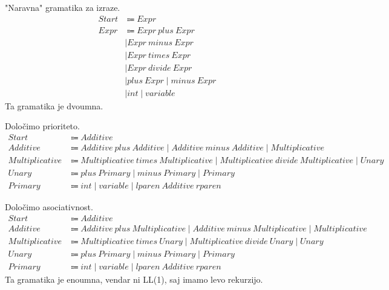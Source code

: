 \documentclass{report}
\newcommand{\Spc}{\ }
\newcommand{\Union}{\mathrel{|}}
\newcommand{\Arrow}{\Coloneq}
\newcommand{\NT}[1]{{#1}}
\newcommand{\T}[1]{{#1}}
\begin{document}
"Naravna" gramatika za izraze.
\begin{align*}
  \NT{Start} &\Arrow \NT{Expr}\\
  \NT{Expr} &\Arrow \NT{Expr} \Spc \T{plus} \Spc \NT{Expr}\\
            &\Union \NT{Expr} \Spc \T{minus} \Spc \NT{Expr}\\
            &\Union \NT{Expr} \Spc \T{times} \Spc \NT{Expr}\\
            &\Union \NT{Expr} \Spc \T{divide} \Spc \NT{Expr}\\
            &\Union \T{plus} \Spc \NT{Expr} \Union \T{minus} \Spc \NT{Expr}\\
            &\Union \T{int} \Union \T{variable}
\end{align*}
Ta gramatika je dvoumna.

Določimo prioriteto.
\begin{align*}
  \NT{Start} &\Arrow \NT{Additive}\\
  \NT{Additive} &\Arrow \NT{Additive} \Spc \T{plus} \Spc \NT{Additive} \Union \NT{Additive} \Spc \T{minus} \Spc \NT{Additive} \Union \NT{Multiplicative}\\
  \NT{Multiplicative} &\Arrow \NT{Multiplicative} \Spc \T{times} \Spc \NT{Multiplicative} \Union \NT{Multiplicative} \Spc \T{divide} \Spc \NT{Multiplicative} \Union \NT{Unary}\\
  \NT{Unary} &\Arrow \T{plus} \Spc \NT{Primary} \Union \T{minus} \Spc \NT{Primary} \Union \NT{Primary}\\ 
  \NT{Primary} &\Arrow \T{int} \Union \T{variable} \Union \T{lparen} \Spc \NT{Additive} \Spc \T{rparen}
\end{align*}

Določimo asociativnost.
\begin{align*}
  \NT{Start} &\Arrow \NT{Additive}\\
  \NT{Additive} &\Arrow \NT{Additive} \Spc \T{plus} \Spc \NT{Multiplicative} \Union \NT{Additive} \Spc \T{minus} \Spc \NT{Multiplicative} \Union \NT{Multiplicative}\\
  \NT{Multiplicative} &\Arrow \NT{Multiplicative} \Spc \T{times} \Spc \NT{Unary} \Union \NT{Multiplicative} \Spc \T{divide} \Spc \NT{Unary} \Union \NT{Unary}\\
  \NT{Unary} &\Arrow \T{plus} \Spc \NT{Primary} \Union \T{minus} \Spc \NT{Primary} \Union \NT{Primary}\\ 
  \NT{Primary} &\Arrow \T{int} \Union \T{variable} \Union \T{lparen} \Spc \NT{Additive} \Spc \T{rparen}
\end{align*}
Ta gramatika je enoumna, vendar ni LL(1), saj imamo levo rekurzijo.
\end{document}

